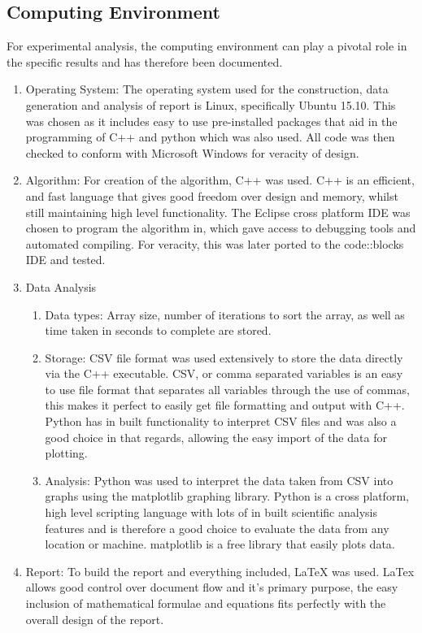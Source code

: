\documentclass[]{article}
\begin{document}
\subsection{Computing Environment}
For experimental analysis, the computing environment can play a pivotal role in the specific results and has therefore been documented. 
\begin{enumerate}
	\item Operating System: The operating system used for the construction, data generation and analysis of report is Linux, specifically Ubuntu 15.10. This was chosen as it includes easy to use pre-installed packages that aid in the programming of C++ and python which was also used. All code was then checked to conform with Microsoft Windows for veracity of design.
	\item Algorithm: For creation of the algorithm, C++ was used. C++ is an efficient, and fast language that gives good freedom over design and memory, whilst still maintaining high level functionality. The Eclipse cross platform IDE was chosen to program the algorithm in, which gave access to debugging tools and automated compiling. For veracity, this was later ported to the code::blocks IDE and tested.
	\item Data Analysis
\begin{enumerate}
	\item Data types: Array size, number of iterations to sort the array, as well as time taken in seconds to complete are stored.
	\item Storage: CSV file format was used extensively to store the data directly via the C++ executable. CSV, or comma separated variables is an easy to use file format that separates all variables through the use of commas, this makes it perfect to easily get file formatting and output with C++. Python has in built functionality to interpret CSV files and was also a good choice in that regards, allowing the easy import of the data for plotting.
	\item Analysis: Python was used to interpret the data taken from CSV into graphs using the matplotlib graphing library. Python is a cross platform, high level scripting language with lots of in built scientific analysis features and is therefore a good choice to evaluate the data from any location or machine. matplotlib is a free library that easily plots data. 
\end{enumerate}
	\item Report: To build the report and everything included, LaTeX was used. LaTex allows good control over document flow and it's primary purpose, the easy inclusion of mathematical formulae and equations fits perfectly with the overall design of the report.
\end{enumerate}
\end{document}
